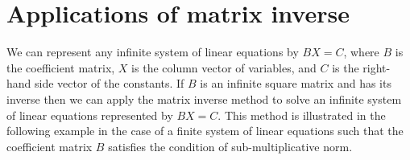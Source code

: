 \bigskip






\section{Applications of matrix inverse}

We can represent any infinite system of linear equations by \(BX = C\), where \(B\) is the coefficient matrix, \(X\) is the column vector of variables, and \(C\) is the right-hand side vector of the constants. If \(B\) is an infinite square matrix and has its inverse then we can apply the matrix inverse method to solve an infinite system of linear equations represented by \(BX = C\). This method is illustrated in the following example in the case of a finite system of linear equations such that the coefficient matrix \(B\) satisfies the condition of sub-multiplicative norm.

